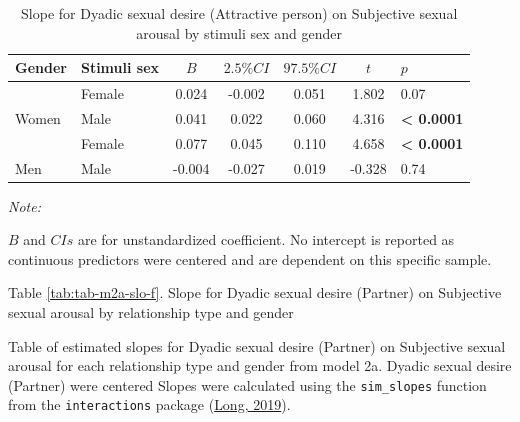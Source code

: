 \documentclass[
  bookmarksnumbered]{article}
\begin{document}
\begin{table}[H]

\caption{\label{tab:tab-m2a-slo-e}Slope for Dyadic sexual desire (Attractive person) on 
        Subjective sexual arousal by stimuli sex and gender}
\centering
\begin{threeparttable}
\begin{tabular}[t]{llccccl}
\toprule
Gender & Stimuli sex & $B$ & $2.5\% CI$ & $97.5\% CI$ & $t$ & $p$\\
\midrule
 & Female & 0.024 & -0.002 & 0.051 & 1.802 & 0.07\\
\cmidrule{2-7}
\multirow{-2}{*}{\raggedright\arraybackslash Women} & Male & 0.041 & 0.022 & 0.060 & 4.316 & \textbf{< 0.0001}\\
\cmidrule{1-7}
 & Female & 0.077 & 0.045 & 0.110 & 4.658 & \textbf{< 0.0001}\\
\cmidrule{2-7}
\multirow{-2}{*}{\raggedright\arraybackslash Men} & Male & -0.004 & -0.027 & 0.019 & -0.328 & 0.74\\
\bottomrule
\end{tabular}
\begin{tablenotes}[para]
\item \textit{Note: } 
\item $B$ and $CIs$ are for unstandardized coefficient.
           No intercept is reported as continuous predictors were centered
           and are dependent on this specific sample.
\end{tablenotes}
\end{threeparttable}
\end{table}

Table \ref{tab:tab-m2a-slo-f}. Slope for Dyadic sexual desire (Partner) on Subjective sexual arousal by relationship type and gender

Table of estimated slopes for Dyadic sexual desire (Partner) on Subjective sexual arousal for each relationship type and gender from model 2a. Dyadic sexual desire (Partner) were centered Slopes were calculated using the \texttt{sim\_slopes} function from the \texttt{interactions} package (\protect\hyperlink{ref-interactionscit}{Long, 2019}).
\end{document}
